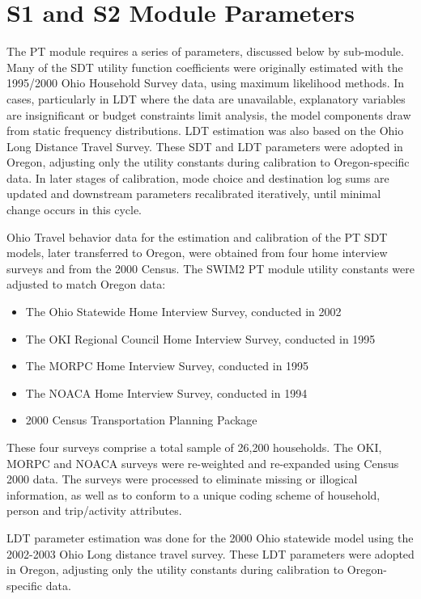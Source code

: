 \section{S1 and S2 Module Parameters}\label{sec:pt-s1-s2}
The PT module requires a series of parameters, discussed below by sub-module. Many of the SDT utility function coefficients were originally estimated with the 1995/2000 Ohio Household Survey data, using maximum likelihood methods. In cases, particularly in LDT where the data are unavailable, explanatory variables are insignificant or budget constraints limit analysis, the model components draw from static frequency distributions. LDT estimation was also based on the Ohio Long Distance Travel Survey. These SDT and LDT parameters were adopted in Oregon, adjusting only the utility constants during calibration to Oregon-specific data. In later stages of calibration, mode choice and destination log sums are updated and downstream parameters recalibrated iteratively, until minimal change occurs in this cycle.

Ohio Travel behavior data for the estimation and calibration of the PT SDT models, later transferred to Oregon, were obtained from four home interview surveys and from the 2000 Census. The SWIM2 PT module utility constants were adjusted to match Oregon data:
\begin{itemize}
\item The Ohio Statewide Home Interview Survey, conducted in 2002
\item The OKI Regional Council Home Interview Survey, conducted in 1995
\item The MORPC Home Interview Survey, conducted in 1995
\item The NOACA Home Interview Survey, conducted in 1994
\item 2000 Census Transportation Planning Package
\end{itemize}

\noindent These four surveys comprise a total sample of 26,200 households. The OKI, MORPC and NOACA surveys were re-weighted and re-expanded using Census 2000 data. The surveys were processed to eliminate missing or illogical information, as well as to conform to a unique coding scheme of household, person and trip/activity attributes.

LDT parameter estimation was done for the 2000 Ohio statewide model using the 2002-2003 Ohio Long distance travel survey. These LDT parameters were adopted in Oregon, adjusting only the utility constants during calibration to Oregon-specific data.

